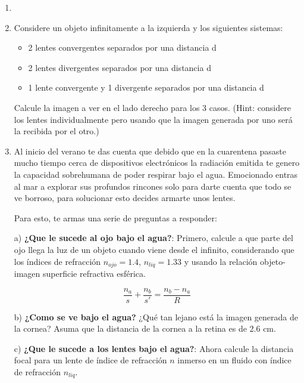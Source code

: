 \documentclass[letterpaper,11pt]{article}
\begin{document}
\vspace{-1cm}
\begin{enumerate}\setlength{\itemsep}{0.4cm}


\item []
\item Considere un objeto infinitamente a la izquierda y los siguientes sistemas:
\begin{itemize}
    \item 2 lentes convergentes separados por una distancia d
    \item 2 lentes divergentes separados por una distancia d
    \item 1 lente convergente y 1 divergente separados por una distancia d
\end{itemize}

Calcule la imagen a ver en el lado derecho para los 3 casos.
(Hint: considere los lentes individualmente pero usando que la imagen generada por uno será la recibida por el otro.)

\item Al inicio del verano te das cuenta que debido que en la cuarentena pasaste mucho tiempo cerca de dispositivos electrónicos la radiación emitida te genero la capacidad sobrehumana de poder respirar bajo el agua. Emocionado entras al mar a explorar sus profundos rincones solo para darte cuenta que todo se ve borroso, para solucionar esto decides armarte unos lentes.

Para esto, te armas una serie de preguntas a responder:

a) \textbf{¿Que le sucede al ojo bajo el agua?}: Primero, calcule a que parte del ojo llega la luz de un objeto cuando viene desde el infinito, considerando que los índices de refracción $n_{ojo} =1.4 $, $n_{liq}=1.33 $ y usando la relación objeto-imagen superficie refractiva esférica.

\begin{equation}
    \frac{n_{a}}{s} + \frac{n_{b}}{s'} = \frac{n_{b}-n_{a}}{R}
\end{equation}

b) \textbf{¿Como se ve bajo el agua?} ¿Qué tan lejano está la imagen generada de la cornea? Asuma que la distancia de la cornea a la retina es de 2.6 cm.

c) \textbf{¿Que le sucede a los lentes bajo el agua?}: Ahora calcule la distancia focal para un lente de índice de refracción $n$ inmerso en un fluido con índice de refracción $n_{liq}$.


\end{enumerate}
\end{document}
